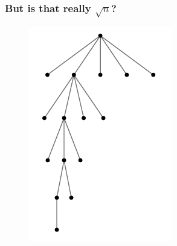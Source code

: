 \documentclass[aspectratio=1610,12pt,notheorems]{beamer}
\begin{document}
\begin{frame} \frametitle{But is that really $\sqrt{n}$?}
\begin{figure}
	\includegraphics[height=0.92\textheight]{algolunch/sqrtn}
\end{figure}
\end{frame}
\end{document}
